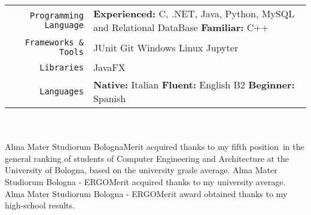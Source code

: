 \documentclass[
    10pt,
    A4,
    english,
    draft = false,
    twoside = false,
]{article}
\begin{document}
	\tab \begin{tabular}{r p{}}
		\texttt{\large Programming Language} & \textbf{Experienced:} C, .NET, Java, Python, MySQL and Relational DataBase \textbf{Familiar:} C++ \\
		\texttt{\large Frameworks \& Tools} & JUnit \cvContactSep Git \cvContactSep Windows \cvContactSep Linux \cvContactSep Jupyter \\
		\texttt{\large Libraries} & JavaFX\\
		\texttt{\large Languages} & \textbf{Native:} Italian \cvContactSep \textbf{Fluent:} English B2 \cvContactSep \textbf{Beginner:} Spanish \\
	\end{tabular}\\~\\
	{Alma Mater Studiorum Bologna}{Merit acquired thanks to my fifth position\ in the general ranking of students of Computer Engineering and Architecture
    at the University of Bologna, based on the university grade average.}
	{Alma Mater Studiorum Bologna - ERGO}{Merit acquired thanks to my university average.}
	{Alma Mater Studiorum Bologna - ERGO}{Merit award obtained thanks to my high-school results.}
	
\end{document}
